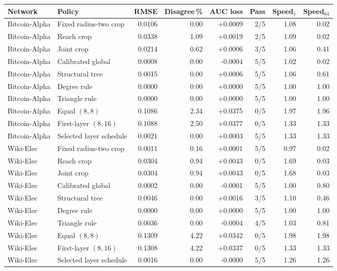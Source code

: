 \begin{tabular}{@{}llrrrrrr@{}}
\toprule
Network & Policy & RMSE & Disagree\,\% & AUC loss & Pass & Speed$_1$ & Speed$_{64}$ \\
\midrule
Bitcoin-Alpha & Fixed radius-two crop & 0.0106 & 0.00 & +0.0009 & 2/5 & 1.08 & 0.02 \\
Bitcoin-Alpha & Reach crop & 0.0338 & 1.09 & +0.0019 & 2/5 & 1.09 & 0.02 \\
Bitcoin-Alpha & Joint crop & 0.0214 & 0.62 & +0.0006 & 3/5 & 1.06 & 0.41 \\
Bitcoin-Alpha & Calibrated global & 0.0008 & 0.00 & -0.0004 & 5/5 & 1.02 & 0.02 \\
Bitcoin-Alpha & Structural tree & 0.0015 & 0.00 & +0.0006 & 5/5 & 1.06 & 0.61 \\
Bitcoin-Alpha & Degree rule & 0.0000 & 0.00 & +0.0000 & 5/5 & 1.00 & 1.00 \\
Bitcoin-Alpha & Triangle rule & 0.0000 & 0.00 & +0.0000 & 5/5 & 1.00 & 1.00 \\
Bitcoin-Alpha & Equal $(8,8)$ & 0.1086 & 2.34 & +0.0375 & 0/5 & 1.97 & 1.96 \\
Bitcoin-Alpha & First-layer $(8,16)$ & 0.1088 & 2.50 & +0.0377 & 0/5 & 1.33 & 1.33 \\
Bitcoin-Alpha & Selected layer schedule & 0.0021 & 0.00 & +0.0003 & 5/5 & 1.33 & 1.33 \\
Wiki-Elec & Fixed radius-two crop & 0.0011 & 0.16 & +0.0001 & 5/5 & 0.97 & 0.02 \\
Wiki-Elec & Reach crop & 0.0304 & 0.94 & +0.0043 & 0/5 & 1.69 & 0.03 \\
Wiki-Elec & Joint crop & 0.0304 & 0.94 & +0.0043 & 0/5 & 1.68 & 0.03 \\
Wiki-Elec & Calibrated global & 0.0002 & 0.00 & -0.0001 & 5/5 & 1.00 & 0.80 \\
Wiki-Elec & Structural tree & 0.0046 & 0.00 & +0.0016 & 3/5 & 1.10 & 0.46 \\
Wiki-Elec & Degree rule & 0.0000 & 0.00 & +0.0000 & 5/5 & 1.00 & 1.00 \\
Wiki-Elec & Triangle rule & 0.0036 & 0.00 & -0.0004 & 4/5 & 1.03 & 0.81 \\
Wiki-Elec & Equal $(8,8)$ & 0.1309 & 4.22 & +0.0342 & 0/5 & 1.98 & 1.98 \\
Wiki-Elec & First-layer $(8,16)$ & 0.1308 & 4.22 & +0.0337 & 0/5 & 1.33 & 1.33 \\
Wiki-Elec & Selected layer schedule & 0.0016 & 0.00 & -0.0000 & 5/5 & 1.26 & 1.26 \\
\bottomrule
\end{tabular}
